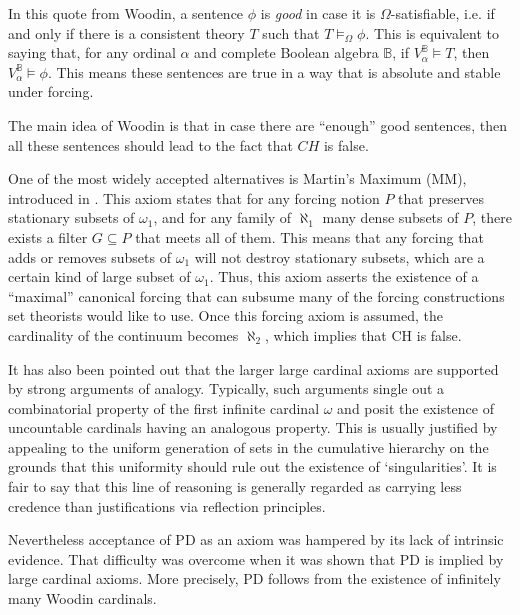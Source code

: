 \documentclass[11pt,a4paper]{book}
\theoremstyle{plain}
\begin{document}
In this quote from Woodin, a sentence $\phi$ is \textit{good} in case it is $\Omega$-satisfiable, i.e. if and only if there is a consistent theory $T$ such that $T \models_\Omega \phi$. This is equivalent to saying that, for any ordinal $\alpha$ and complete Boolean algebra $\mathbb{B}$, if $V^\mathbb{B}_\alpha \models T$, then $V^\mathbb{B}_\alpha \models \phi$. This means these sentences are true in a way that is absolute and stable under forcing.

The main idea of Woodin is that in case there are “enough” good sentences, then all these sentences should lead to the fact that $CH$ is false.

One of the most widely accepted alternatives is Martin's Maximum (MM), introduced in \cite{ForemanMagidorShelah1988}. This axiom states that for any forcing notion $P$ that preserves stationary subsets of $\omega_1$, and for any family of $\aleph_1$ many dense subsets of $P$, there exists a filter $G \subseteq P$ that meets all of them. This means that any forcing that adds or removes subsets of $\omega_1$ will not destroy stationary subsets, which are a certain kind of large subset of $\omega_1$. Thus, this axiom asserts the existence of a ``maximal'' canonical forcing that can subsume many of the forcing constructions set theorists would like to use. Once this forcing axiom is assumed, the cardinality of the continuum becomes $\aleph_2$, which implies that CH is false.


It has also been pointed out that the larger large cardinal axioms are supported by strong arguments of analogy. Typically, such arguments single out a combinatorial property of the first infinite cardinal $\omega$ and posit the existence of uncountable cardinals having an analogous property. This is usually justified by appealing to the uniform generation of sets in the cumulative hierarchy on the grounds that this uniformity should rule out the existence of ‘singularities’. It is fair to say that this line of reasoning is generally regarded as carrying less credence than justifications via reflection principles. \textcite[p. 97]{hauser2004}

Nevertheless acceptance of PD as an axiom was hampered by its lack of intrinsic evidence. That difficulty was overcome when it was shown that PD is implied by large cardinal axioms. More precisely, PD follows from the existence of infinitely many Woodin cardinals. \textcite[p. 99]{hauser2004}
\end{document}
